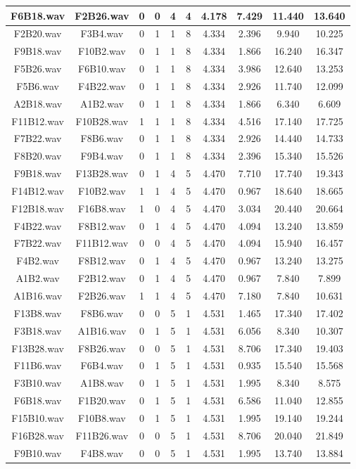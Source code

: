 \documentclass[11pt,a4paper]{book}
\begin{document}
\begin{longtable}[c]{|c|c|c|c|c|c|c|c|c|c|}
F6B18.wav&F2B26.wav&0&0&4&4&4.178&7.429&11.440&13.640\\ \hline
F2B20.wav&F3B4.wav&0&1&1&8&4.334&2.396&9.940&10.225\\ \hline
F9B18.wav&F10B2.wav&0&1&1&8&4.334&1.866&16.240&16.347\\ \hline
F5B26.wav&F6B10.wav&0&1&1&8&4.334&3.986&12.640&13.253\\ \hline
F5B6.wav&F4B22.wav&0&1&1&8&4.334&2.926&11.740&12.099\\ \hline
A2B18.wav&A1B2.wav&0&1&1&8&4.334&1.866&6.340&6.609\\ \hline
F11B12.wav&F10B28.wav&1&1&1&8&4.334&4.516&17.140&17.725\\ \hline
F7B22.wav&F8B6.wav&0&1&1&8&4.334&2.926&14.440&14.733\\ \hline
F8B20.wav&F9B4.wav&0&1&1&8&4.334&2.396&15.340&15.526\\ \hline
F9B18.wav&F13B28.wav&0&1&4&5&4.470&7.710&17.740&19.343\\ \hline
F14B12.wav&F10B2.wav&1&1&4&5&4.470&0.967&18.640&18.665\\ \hline
F12B18.wav&F16B8.wav&1&0&4&5&4.470&3.034&20.440&20.664\\ \hline
F4B22.wav&F8B12.wav&0&1&4&5&4.470&4.094&13.240&13.859\\ \hline
F7B22.wav&F11B12.wav&0&0&4&5&4.470&4.094&15.940&16.457\\ \hline
F4B2.wav&F8B12.wav&0&1&4&5&4.470&0.967&13.240&13.275\\ \hline
A1B2.wav&F2B12.wav&0&1&4&5&4.470&0.967&7.840&7.899\\ \hline
A1B16.wav&F2B26.wav&1&1&4&5&4.470&7.180&7.840&10.631\\ \hline
F13B8.wav&F8B6.wav&0&0&5&1&4.531&1.465&17.340&17.402\\ \hline
F3B18.wav&A1B16.wav&0&1&5&1&4.531&6.056&8.340&10.307\\ \hline
F13B28.wav&F8B26.wav&0&0&5&1&4.531&8.706&17.340&19.403\\ \hline
F11B6.wav&F6B4.wav&0&1&5&1&4.531&0.935&15.540&15.568\\ \hline
F3B10.wav&A1B8.wav&0&1&5&1&4.531&1.995&8.340&8.575\\ \hline
F6B18.wav&F1B20.wav&0&1&5&1&4.531&6.586&11.040&12.855\\ \hline
F15B10.wav&F10B8.wav&0&1&5&1&4.531&1.995&19.140&19.244\\ \hline
F16B28.wav&F11B26.wav&0&0&5&1&4.531&8.706&20.040&21.849\\ \hline
F9B10.wav&F4B8.wav&0&0&5&1&4.531&1.995&13.740&13.884\\ \hline

\end{longtable}
\end{document}
